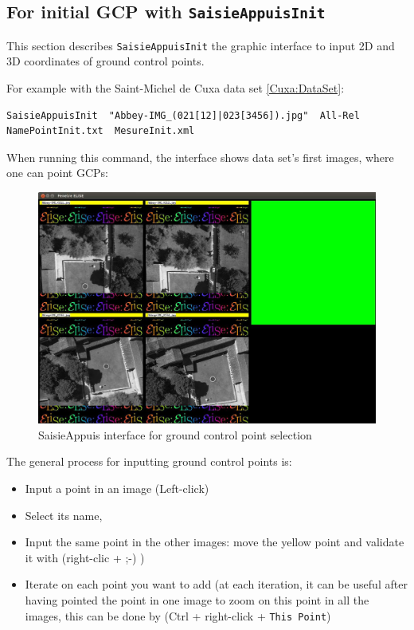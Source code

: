 \subsection{For initial GCP  with {\tt SaisieAppuisInit}}
\label{SaisieAppuisInit}

This section describes {\tt SaisieAppuisInit} the graphic interface to input 2D and 3D coordinates of ground control points.

For example with the Saint-Michel de Cuxa data set \ref{Cuxa:DataSet}:

\begin{verbatim}
SaisieAppuisInit  "Abbey-IMG_(021[12]|023[3456]).jpg"  All-Rel  NamePointInit.txt  MesureInit.xml
\end{verbatim}

When running this command, the interface shows data set's first images, where one can point GCPs:

\begin{figure}[H]
\begin{center}
\includegraphics[width=160mm]{FIGS/Saisie/interface.jpg}
\end{center}
\caption{SaisieAppuis interface for ground control point selection}
\label{FIG:SaisieAppuis:interface}
\end{figure}

The general process for inputting ground control points is:
\begin{itemize}
\item Input a point in an image (Left-click)
\item Select its name,
\item Input the same point in the other images: move the yellow point and validate it with (right-clic + ;-) )
\item Iterate on each point you want to add (at each iteration, it can be useful after having pointed the point in one image to zoom on this point in all the images,
this can be done by (Ctrl + right-click + {\tt This Point})
\end{itemize}

